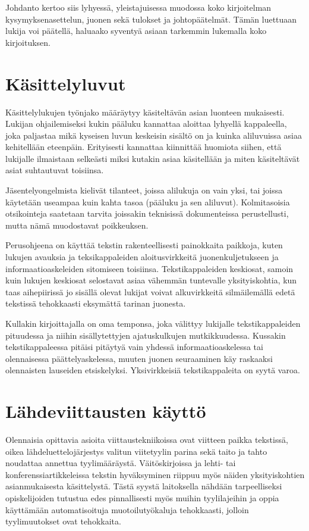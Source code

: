 Johdanto kertoo siis lyhyessä, yleistajuisessa muodossa
koko kirjoitelman kysymyksenasettelun, juonen sekä tulokset ja johtopäätelmät.
Tämän luettuaan lukija voi päätellä, haluaako syventyä asiaan tarkemmin
lukemalla koko kirjoituksen.


\section{Käsittelyluvut}

Käsittelylukujen työnjako määräytyy käsiteltävän asian luonteen
mukaisesti.
Lukijan ohjailemiseksi kukin pääluku kannattaa aloittaa lyhyellä
kappaleella, joka paljastaa mikä kyseisen luvun keskeisin sisältö on ja
kuinka aliluvuissa asiaa kehitellään eteenpäin.
Erityisesti kannattaa kiinnittää huomiota siihen, että lukijalle ilmaistaan selkeästi miksi kutakin asiaa käsitellään ja miten käsiteltävät asiat suhtautuvat toisiinsa. 

Jäsentelyongelmista kielivät tilanteet, joissa
alilukuja on vain yksi, tai joissa käytetään useampaa kuin
kahta tasoa (pääluku ja sen aliluvut). Kolmitasoisia
otsikointeja saatetaan tarvita joissakin teknisissä
dokumenteissa perustellusti, mutta nämä muodostavat poikkeuksen.

Perusohjeena on käyttää tekstin rakenteellisesti painokkaita paikkoja,
kuten lukujen avauksia ja teksikappaleiden aloitusvirkkeitä
juonenkuljetukseen ja informaatioaskeleiden sitomiseen toisiinsa.
Tekstikappaleiden keskiosat, samoin kuin lukujen keskiosat selostavat
asiaa vähemmän tuntevalle yksityiskohtia, kun taas aihepiirissä jo
sisällä olevat lukijat voivat alkuvirkkeitä silmäilemällä edetä
tekstissä tehokkaasti eksymättä tarinan juonesta.

Kullakin kirjoittajalla on oma temponsa, joka välittyy lukijalle
tekstikappaleiden pituudessa ja niihin sisällytettyjen ajatuskulkujen
mutkikkuudessa. Kussakin tekstikappaleessa pitäisi pitäytyä vain yhdessä
informaatioaskelessa tai olennaisessa päättelyaskelessa, muuten juonen
seuraaminen käy raskaaksi olennaisten lauseiden etsiskelyksi. Yksivirkkeisiä
tekstikappaleita on syytä varoa. 



\section{Lähdeviittausten käyttö}


Olennaisia opittavia asioita viittaustekniikoissa ovat viitteen paikka
tekstissä, oikea lähdeluettelojärjestys valitun viitetyylin parina sekä
taito ja tahto noudattaa annettua tyylimääräystä. Väitöskirjoissa ja
lehti- tai konferenssiartikkeleissa tekstin hyväksyminen riippuu myös
näiden yksityiskohtien asianmukaisesta käsittelystä. Tästä syystä
laitoksella nähdään tarpeelliseksi opiskelijoiden tutustua edes
pinnallisesti myös muihin tyylilajeihin ja oppia käyttämään
automatisoituja muotoilutyökaluja tehokkaasti, jolloin tyylimuutokset
ovat tehokkaita.

